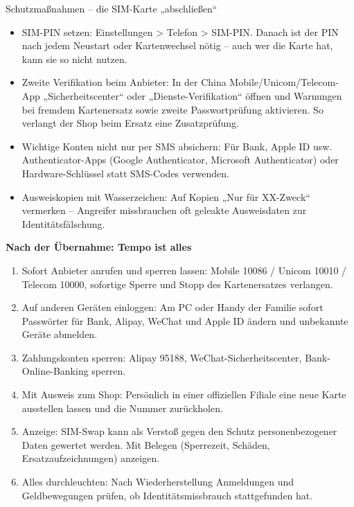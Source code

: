 \begin{tcbwarn}{Schutzmaßnahmen – die SIM-Karte „abschließen“}
\begin{itemize}
  \item SIM-PIN setzen: Einstellungen > Telefon > SIM-PIN. Danach ist der PIN nach jedem Neustart oder Kartenwechsel nötig – auch wer die Karte hat, kann sie so nicht nutzen.
  \item Zweite Verifikation beim Anbieter: In der China Mobile/Unicom/Telecom-App „Sicherheitscenter“ oder „Dienste-Verifikation“ öffnen und Warnungen bei fremdem Kartenersatz sowie zweite Passwortprüfung aktivieren. So verlangt der Shop beim Ersatz eine Zusatzprüfung.
  \item Wichtige Konten nicht nur per SMS absichern: Für Bank, Apple ID usw. Authenticator-Apps (Google Authenticator, Microsoft Authenticator) oder Hardware-Schlüssel statt SMS-Codes verwenden.
  \item Ausweiskopien mit Wasserzeichen: Auf Kopien „Nur für XX-Zweck“ vermerken – Angreifer missbrauchen oft geleakte Ausweisdaten zur Identitätsfälschung.
\end{itemize}

\end{tcbwarn}

\textbf{Nach der Übernahme: Tempo ist alles}\par

\begin{enumerate}
  \item Sofort Anbieter anrufen und sperren lassen: Mobile 10086 / Unicom 10010 / Telecom 10000, sofortige Sperre und Stopp des Kartenersatzes verlangen.
  \item Auf anderen Geräten einloggen: Am PC oder Handy der Familie sofort Passwörter für Bank, Alipay, WeChat und Apple ID ändern und unbekannte Geräte abmelden.
  \item Zahlungskonten sperren: Alipay 95188, WeChat-Sicherheitscenter, Bank-Online-Banking sperren.
  \item Mit Ausweis zum Shop: Persönlich in einer offiziellen Filiale eine neue Karte ausstellen lassen und die Nummer zurückholen.
  \item Anzeige: SIM-Swap kann als Verstoß gegen den Schutz personenbezogener Daten gewertet werden. Mit Belegen (Sperrezeit, Schäden, Ersatzaufzeichnungen) anzeigen.
  \item Alles durchleuchten: Nach Wiederherstellung Anmeldungen und Geldbewegungen prüfen, ob Identitätsmissbrauch stattgefunden hat.
\end{enumerate}

